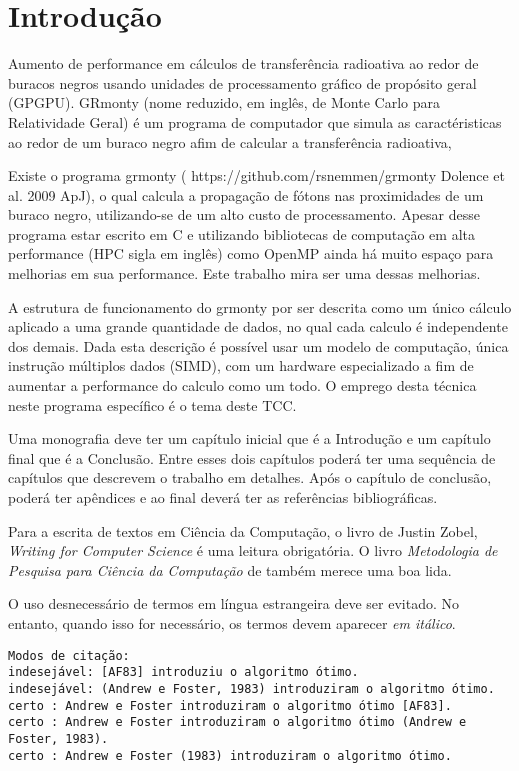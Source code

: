 \chapter{Introdução}
\label{cap:introducao}

Aumento de performance em cálculos de transferência radioativa ao redor de
buracos negros usando unidades de processamento gráfico de propósito geral
(GPGPU).
GRmonty (nome reduzido, em inglês, de Monte Carlo para Relatividade Geral) é um programa de computador que simula as caractéristicas ao redor de um buraco negro afim de calcular a transferência radioativa,


Existe o programa grmonty ( https://github.com/rsnemmen/grmonty Dolence et al. 2009 ApJ),
o qual calcula a propagação de fótons nas proximidades de um buraco negro,
utilizando-se de um alto custo de processamento. Apesar desse programa estar
escrito em C e utilizando bibliotecas de computação em alta performance
(HPC sigla em inglês) como OpenMP ainda há muito espaço para melhorias em sua
performance. Este trabalho mira ser uma dessas melhorias.

A estrutura de funcionamento do grmonty por ser descrita como um único cálculo
aplicado a uma grande quantidade de dados, no qual cada calculo é independente
dos demais. Dada esta descrição é possível usar um modelo de computação, única
instrução múltiplos dados (SIMD), com um hardware especializado a fim de
aumentar a performance do calculo como um todo. O emprego desta técnica neste
programa específico é o tema deste TCC.

Uma monografia deve ter um capítulo inicial que é a Introdução e um
capítulo final que é a Conclusão. Entre esses dois capítulos poderá
ter uma sequência de capítulos que descrevem o trabalho em detalhes.
Após o capítulo de conclusão, poderá ter apêndices e ao final deverá
ter as referências bibliográficas.


Para a escrita de textos em Ciência da Computação, o livro de Justin Zobel,
\emph{Writing for Computer Science} \citep{zobel:04} é uma leitura obrigatória.
O livro \emph{Metodologia de Pesquisa para Ciência da Computação} de
\citet{waz:09} também merece uma boa lida.

O uso desnecessário de termos em língua estrangeira deve ser evitado. No entanto,
quando isso for necessário, os termos devem aparecer \emph{em itálico}.

\begin{small}
\begin{verbatim}
Modos de citação:
indesejável: [AF83] introduziu o algoritmo ótimo.
indesejável: (Andrew e Foster, 1983) introduziram o algoritmo ótimo.
certo : Andrew e Foster introduziram o algoritmo ótimo [AF83].
certo : Andrew e Foster introduziram o algoritmo ótimo (Andrew e Foster, 1983).
certo : Andrew e Foster (1983) introduziram o algoritmo ótimo.
\end{verbatim}
\end{small}

